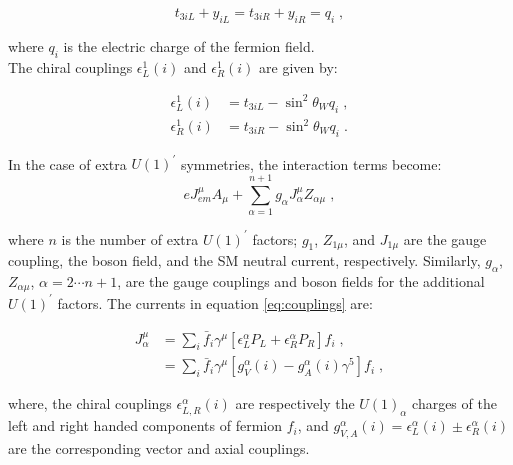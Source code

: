  \begin{equation}
  t_{3iL} + y_{iL} = t_{3iR} + y_{iR} = q_{i} \; ,
 \end{equation}

 \noindent where $q_{i}$ is the electric charge of the fermion field.\\
 
 \noindent The chiral couplings $\epsilon_{L}^{1}(i)$ and $\epsilon_{R}^{1}(i)$ are given by:
 
 \begin{equation}
 \begin{split}
 \epsilon_{L}^{1}(i) &= t_{3i L} -\sin^{2} \theta_{W} q_{i} \; ,  \\
 \epsilon_{R}^{1}(i) &= t_{3i R} -\sin^{2} \theta_{W} q_{i} \; . 
 \end{split}
 \end{equation}
 
 \noindent In the case of extra $U(1)^{\prime}$ symmetries, the interaction 
 terms become:
 \begin{equation}
  e J_{em}^{\mu} A_{\mu} + \sum_{\alpha = 1}^{n+1} g_{\alpha} J^{\mu}_{\alpha}Z_{\alpha \mu} \; ,
  \label{eq:couplings}
 \end{equation}

 \noindent where $n$ is the number of extra $U(1)^{\prime}$ factors; 
 $g_{1}$, $Z_{1\mu}$, and $J_{1\mu}$ are the gauge coupling, the boson field, and 
 the SM neutral current, respectively. Similarly, $g_{\alpha}$, $Z_{\alpha \mu}$,
 $\alpha = 2 \cdots n+1 $, are the gauge couplings and boson fields
 for the additional $U(1)^{\prime}$ factors. The currents in equation
 \ref{eq:couplings} are:

 \begin{equation}
 \begin{split}
J_{\alpha}^{\mu}   &= \sum_{i} \bar{f}_{i} \gamma^{\mu} \left[\epsilon_{L}^{\alpha} P_{L} + \epsilon_{R}^{\alpha} P_{R} \right] f_{i} \; ,  \\
                   &= \sum_{i} \bar{f}_{i} \gamma^{\mu} \left[g_{V}^{\alpha}(i) - g_{A}^{\alpha}(i)\gamma^{5} \right] f_{i} \; ,
 \end{split}
 \end{equation}

 \noindent where, the chiral couplings $\epsilon_{L,R}^{\alpha}(i)$ are 
 respectively the $U(1)_{\alpha}$ charges of the left and right 
 handed components of fermion $f_{i}$, and $g_{V,A}^{\alpha}(i) = \epsilon_{L}^{\alpha}(i) \pm \epsilon_{R}^{\alpha}(i)$
  are the corresponding vector and axial couplings. \\

